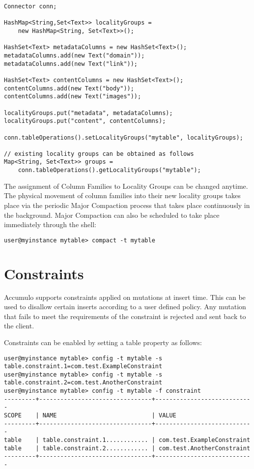 \small
\begin{verbatim}
Connector conn;

HashMap<String,Set<Text>> localityGroups =
    new HashMap<String, Set<Text>>();

HashSet<Text> metadataColumns = new HashSet<Text>();
metadataColumns.add(new Text("domain"));
metadataColumns.add(new Text("link"));

HashSet<Text> contentColumns = new HashSet<Text>();
contentColumns.add(new Text("body"));
contentColumns.add(new Text("images"));

localityGroups.put("metadata", metadataColumns);
localityGroups.put("content", contentColumns);

conn.tableOperations().setLocalityGroups("mytable", localityGroups);

// existing locality groups can be obtained as follows
Map<String, Set<Text>> groups =
    conn.tableOperations().getLocalityGroups("mytable");
\end{verbatim}
\normalsize

The assignment of Column Families to Locality Groups can be changed anytime. The
physical movement of column families into their new locality groups takes place via
the periodic Major Compaction process that takes place continuously in the
background. Major Compaction can also be scheduled to take place immediately
through the shell:

\small
\begin{verbatim}
user@myinstance mytable> compact -t mytable
\end{verbatim}
\normalsize

\section{Constraints}

Accumulo supports constraints applied on mutations at insert time. This can be
used to disallow certain inserts according to a user defined policy. Any mutation
that fails to meet the requirements of the constraint is rejected and sent back to the
client.

Constraints can be enabled by setting a table property as follows:

\small
\begin{verbatim}
user@myinstance mytable> config -t mytable -s table.constraint.1=com.test.ExampleConstraint
user@myinstance mytable> config -t mytable -s table.constraint.2=com.test.AnotherConstraint
user@myinstance mytable> config -t mytable -f constraint
---------+--------------------------------+----------------------------
SCOPE    | NAME                           | VALUE
---------+--------------------------------+----------------------------
table    | table.constraint.1............ | com.test.ExampleConstraint
table    | table.constraint.2............ | com.test.AnotherConstraint
---------+--------------------------------+----------------------------
\end{verbatim}
\normalsize

